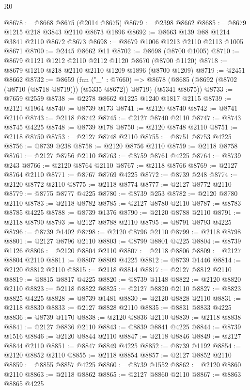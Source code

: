 \begin{lexlean}{R0}
\begin{coremodule}
@8678 := @8668 @8675 (@2014 @8675)
@8679 := @2398 @8662
@8685 := @8679 @1215 @218 @3843 @2110 @8673 @1896
@8692 := @8663 @139 @88 @1214 @3841 @2110 @8672 @8673
@8698 := @8679 @1006 @1213 @2110 @2113 @1005 @8671
@8700 := @2445 @8662 @11
@8702 := @8698 (@8700 @1005)
@8710 := @8679 @1121 @1212 @2110 @2112 @1120 @8670 (@8700 @1120)
@8718 := @8679 @1210 @218 @2110 @2110 @1209 @1896 (@8700 @1209)
@8719 := @2451 @8662
@8732 := @8659
    (fun ("_" : @7660) =>
    @8678 (@8685 (@8692 (@8702 (@8710 (@8718 @8719))) (@5335 @8672)) @8719) (@5341 @8675))
@8733 := @7659 @2559
@8738 := @2278 @8662 @1225 @1240 @1817 @2115
@8739 := @2121 @1964
@8740 := @8739 @173
@8741 := @2120 @8740
@8742 := @8741 @2110
@8743 := @2118 @8742
@8745 := @2127 @8740 @2110
@8747 := @8743 @8745 @4225
@8748 := @8739 @178
@8750 := @2120 @8748 @2110
@8751 := @2118 @8750
@8753 := @2127 @8748 @2110
@8755 := @8751 @8753 @4225
@8756 := @8739 @238
@8758 := @2120 @8756 @2110
@8759 := @2118 @8758
@8761 := @2127 @8756 @2110
@8763 := @8759 @8761 @4225
@8764 := @8739 @243
@8766 := @2120 @8764 @2110
@8767 := @2118 @8766
@8769 := @2127 @8764 @2110
@8771 := @8767 @8769 @4225
@8772 := @8739 @248
@8774 := @2120 @8772 @2110
@8775 := @2118 @8774
@8777 := @2127 @8772 @2110
@8779 := @8775 @8777 @4225
@8780 := @8739 @253
@8782 := @2120 @8780 @2110
@8783 := @2118 @8782
@8785 := @2127 @8780 @2110
@8787 := @8783 @8785 @4225
@8788 := @8739 @1376
@8790 := @2120 @8788 @2110
@8791 := @2118 @8790
@8793 := @2127 @8788 @2110
@8795 := @8791 @8793 @4225
@8796 := @8739 @1402
@8798 := @2120 @8796 @2110
@8799 := @2118 @8798
@8801 := @2127 @8796 @2110
@8803 := @8799 @8801 @4225
@8804 := @8739 @1126
@8806 := @2120 @8804 @2110
@8807 := @2118 @8806
@8809 := @2127 @8804 @2110
@8811 := @8807 @8809 @4225
@8812 := @8739 @1446
@8814 := @2120 @8812 @2110
@8815 := @2118 @8814
@8817 := @2127 @8812 @2110
@8819 := @8815 @8817 @4225
@8820 := @8739 @1148
@8822 := @2120 @8820 @2110
@8823 := @2118 @8822
@8825 := @2127 @8820 @2110
@8827 := @8823 @8825 @4225
@8828 := @8739 @1481
@8830 := @2120 @8828 @2110
@8831 := @2118 @8830
@8833 := @2127 @8828 @2110
@8835 := @8831 @8833 @4225
@8836 := @8739 @1170
@8838 := @2120 @8836 @2110
@8839 := @2118 @8838
@8841 := @2127 @8836 @2110
@8843 := @8839 @8841 @4225
@8844 := @8739 @1516
@8846 := @2120 @8844 @2110
@8847 := @2118 @8846
@8849 := @2127 @8844 @2110
@8851 := @8847 @8849 @4225
@8852 := @8739 @1192
@8854 := @2120 @8852 @2110
@8855 := @2118 @8854
@8857 := @2127 @8852 @2110
@8859 := @8855 @8857 @4225
@8860 := @8739 @1552
@8862 := @2120 @8860 @2110
@8863 := @2118 @8862
@8865 := @2127 @8860 @2110
@8867 := @8863 @8865 @4225

\end{coremodule}
\end{lexlean}
